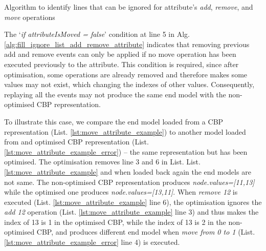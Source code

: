 \documentclass[sigconf]{acmart}
\begin{document}
\begin{algorithm}
\caption{Algorithm to identify lines that can be ignored for attribute's \emph{add}, \emph{remove}, and \emph{move} operations}
\label{alg:fill_ignore_list_add_remove_attribute}
\end{algorithm}

The `\emph{if attributeIsMoved = false}' condition at line 5 in Alg. \ref{alg:fill_ignore_list_add_remove_attribute} indicates that removing previous add and remove events can only be applied if no move operation has been executed previously to the attribute. This condition is required, since after optimisation, some operations are already removed and therefore makes some values may not exist, which changing the indexes of other values. Consequently, replaying all the events may not produce the same end model with the non-optimised CBP representation. 

To illustrate this case, we compare the end model loaded from a CBP representation (List. \ref{lst:move_attribute_example}) to another model loaded from and optimised CBP representation (List. \ref{lst:move_attribute_example_error}) -- the same representation but has been optimised. The optimisation removes line 3 and 6 in List. List. \ref{lst:move_attribute_example} and when loaded back again the end models are not same. The non-optimised CBP representation produces \emph{node.values=[11,13]} while the optimised one produces \emph{node.values=[13,11]}. When \emph{remove 12} is executed (List. \ref{lst:move_attribute_example} line 6), the optimisation ignores the \emph{add 12} operation (List. \ref{lst:move_attribute_example} line 3) and thus makes the index of 13 is 1 in the optimised CBP, while the index of 13 is 2 in the non-optimised CBP, and produces different end model when \emph{move from 0 to 1} (List. \ref{lst:move_attribute_example_error} line 4) is executed. 
\end{document}
